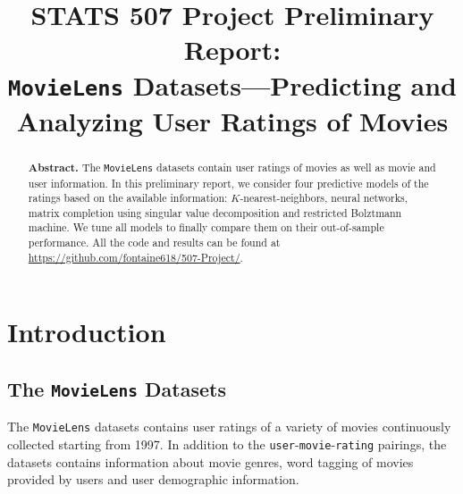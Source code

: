 \documentclass[bj, preprint]{imsart}
\begin{document}
\begin{frontmatter}

\title{{\Large STATS 507 Project Preliminary Report:} \\ 
\bf \texttt{MovieLens} Datasets---Predicting and Analyzing User Ratings of Movies}




\begin{abstract}
\textbf{Abstract.} The \texttt{MovieLens} datasets contain user ratings of movies as well as movie and user information. In this preliminary report, we consider four predictive models of the ratings based on the available information: $K$-nearest-neighbors, neural networks, matrix completion using singular value decomposition and  restricted Bolztmann machine. We tune all models to finally compare them on their out-of-sample performance. All the code and results can be found at \url{https://github.com/fontaine618/507-Project/}.
\end{abstract}

\end{frontmatter}


\newpage
\tableofcontents
\newpage
\section{Introduction}\label{sec:intro}
\subsection{The \texttt{MovieLens} Datasets}\label{subsec:dataset}

The \texttt{MovieLens} datasets \citep{harper2015MovieLensDatasetsHistory} contains user ratings of a variety of movies continuously collected starting from 1997. 
In addition to the \texttt{user}-\texttt{movie}-\texttt{rating} pairings, the datasets contains information about movie genres, word tagging of movies provided by users and user demographic information. 
\end{document}
